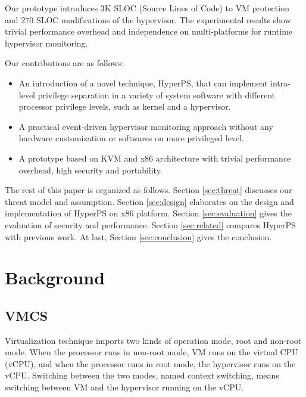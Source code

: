 \documentclass[conference]{IEEEtran}
\begin{document}
Our prototype introduces 3K SLOC (Source Lines of Code) to VM protection and 270 SLOC modifications of the hypervisor.
The experimental results show trivial performance overhead and independence on multi-platforms for runtime hypervisor monitoring. 


Our contributions are as follows:
\begin{itemize}
\item{An introduction of a novel technique, HyperPS, that can implement intra-level privilege separation in a variety of system software with different processor privilege levels, such as kernel and a hypervisor.}

\item{A practical event-driven hypervisor monitoring approach without any hardware customization or softwares on more privileged level.}

\item{A prototype based on KVM and x86 architecture with trivial performance overhead, high security and portability.}
\end{itemize}

The rest of this paper is organized as follows. Section \ref{sec:threat} discusses our threat model and assumption. Section \ref{sec:design} elaborates on the design and implementation of HyperPS on x86 platform. Section \ref{sec:evaluation} gives the evaluation of security and performance. Section \ref{sec:related} compares HyperPS with previous work. At last, Section \ref{sec:conclusion} gives the conclusion.

%
%
%
%
%


\section{Background}

\subsection{VMCS}
Virtualization technique imports two kinds of operation mode, root and non-root mode. 
When the processor runs in non-root mode, VM runs on the virtual CPU (vCPU), and when the processor runs in root mode, the hypervisor runs on the vCPU. 
Switching between the two modes, named context switching, means switching between VM and the hypervisor running on the vCPU. 
\end{document}
